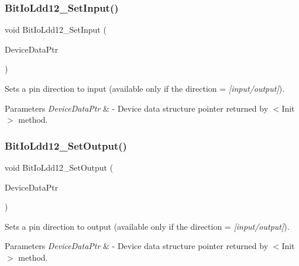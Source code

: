 \subsubsection{\texorpdfstring{Bit\+Io\+Ldd12\+\_\+\+Set\+Input()}{BitIoLdd12\_SetInput()}}
{\footnotesize\ttfamily void Bit\+Io\+Ldd12\+\_\+\+Set\+Input (\begin{DoxyParamCaption}\item[{\hyperlink{group___p_e___types__module_gac5cf1362f1f0e3a2ce71b1bf2276d091}{L\+D\+D\+\_\+\+T\+Device\+Data} $\ast$}]{Device\+Data\+Ptr }\end{DoxyParamCaption})}



Sets a pin direction to input (available only if the direction = {\itshape \mbox{[}input/output\mbox{]}}). 


\begin{DoxyParams}{Parameters}
{\em Device\+Data\+Ptr} & -\/ Device data structure pointer returned by $<$\+Init$>$ method. \\
\hline
\end{DoxyParams}
\mbox{\label{group___bit_io_ldd12__module_gab9c2b2a95e81ed484e4328f795f0e827}} 
\subsubsection{\texorpdfstring{Bit\+Io\+Ldd12\+\_\+\+Set\+Output()}{BitIoLdd12\_SetOutput()}}
{\footnotesize\ttfamily void Bit\+Io\+Ldd12\+\_\+\+Set\+Output (\begin{DoxyParamCaption}\item[{\hyperlink{group___p_e___types__module_gac5cf1362f1f0e3a2ce71b1bf2276d091}{L\+D\+D\+\_\+\+T\+Device\+Data} $\ast$}]{Device\+Data\+Ptr }\end{DoxyParamCaption})}



Sets a pin direction to output (available only if the direction = {\itshape \mbox{[}input/output\mbox{]}}). 


\begin{DoxyParams}{Parameters}
{\em Device\+Data\+Ptr} & -\/ Device data structure pointer returned by $<$\+Init$>$ method. \\
\hline
\end{DoxyParams}
\mbox{\label{group___bit_io_ldd12__module_ga2cdd9908f20433ebead9d031e6abe07c}} 

